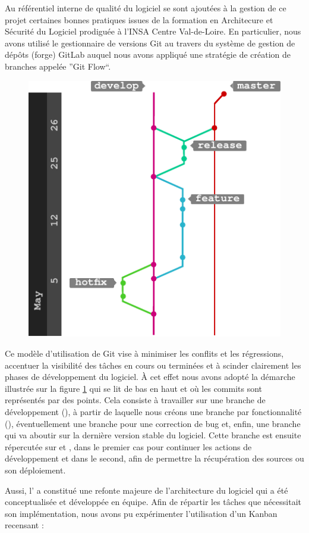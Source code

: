   Au référentiel interne de qualité du logiciel se sont ajoutées à la gestion de ce projet certaines bonnes pratiques issues de la formation en Architecure et Sécurité du Logiciel prodiguée à l'INSA Centre Val-de-Loire.
  En particulier, nous avons utilisé le gestionnaire de versions Git au travers du système de gestion de dépôts (forge) GitLab auquel nous avons appliqué une stratégie de création de branches appelée ''Git Flow``.
    \begin{figure}[h]
    \centering
      \includegraphics[width=.6\linewidth]{figures/gitflow}  
    \label{fig:gitflow}
  \end{figure}
  Ce modèle d'utilisation de Git vise à minimiser les conflits et les régressions, accentuer la visibilité des tâches en cours ou terminées et à scinder clairement les phases de développement du logiciel. 
  \`{A} cet effet nous avons adopté la démarche illustrée sur la figure \ref{fig:gitflow} qui se lit de bas en haut et où les commits sont représentés par des points.
  Cela consiste à travailler sur une branche de développement (), à partir de laquelle nous créons une branche par fonctionnalité (), éventuellement une branche  pour une correction de bug
  et, enfin, une branche  qui va aboutir sur la dernière version stable du logiciel.
  Cette branche est ensuite répercutée sur  et , dans le premier cas  pour continuer les actions de développement et dans le second, afin de permettre la récupération des sources ou son déploiement. 
  
  Aussi, l' a constitué une refonte majeure de l'architecture du logiciel qui a été conceptualisée et développée en équipe. 
  Afin de répartir les tâches que nécessitait son implémentation, nous avons pu expérimenter l'utilisation d'un \gls{Kanban} recensant : 
  
